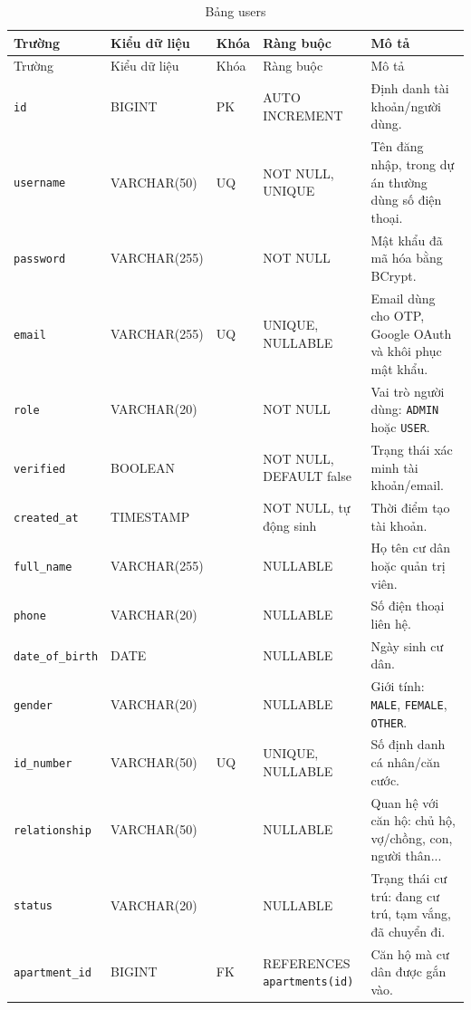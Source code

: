 ﻿\documentclass[12pt,a4paper]{report}
\begin{document}
\begingroup\scriptsize

\begin{longtable}{L{4.2cm} L{2.15cm} L{0.75cm} L{3.05cm} L{4.0cm}}
\caption{Bảng users}\label{tab:db-users}\\
\toprule
Trường & Kiểu dữ liệu & Khóa & Ràng buộc & Mô tả \\
\midrule
\endfirsthead
\toprule Trường & Kiểu dữ liệu & Khóa & Ràng buộc & Mô tả \\\midrule
\endhead
\texttt{id} & BIGINT & PK & AUTO INCREMENT & Định danh tài khoản/người dùng. \\
\texttt{username} & VARCHAR(50) & UQ & NOT NULL, UNIQUE & Tên đăng nhập, trong dự án thường dùng số điện thoại. \\
\texttt{password} & VARCHAR(255) & & NOT NULL & Mật khẩu đã mã hóa bằng BCrypt. \\
\texttt{email} & VARCHAR(255) & UQ & UNIQUE, NULLABLE & Email dùng cho OTP, Google OAuth và khôi phục mật khẩu. \\
\texttt{role} & VARCHAR(20) & & NOT NULL & Vai trò người dùng: \texttt{ADMIN} hoặc \texttt{USER}. \\
\texttt{verified} & BOOLEAN & & NOT NULL, DEFAULT false & Trạng thái xác minh tài khoản/email. \\
\texttt{created\_at} & TIMESTAMP & & NOT NULL, tự động sinh & Thời điểm tạo tài khoản. \\
\texttt{full\_name} & VARCHAR(255) & & NULLABLE & Họ tên cư dân hoặc quản trị viên. \\
\texttt{phone} & VARCHAR(20) & & NULLABLE & Số điện thoại liên hệ. \\
\texttt{date\_of\_birth} & DATE & & NULLABLE & Ngày sinh cư dân. \\
\texttt{gender} & VARCHAR(20) & & NULLABLE & Giới tính: \texttt{MALE}, \texttt{FEMALE}, \texttt{OTHER}. \\
\texttt{id\_number} & VARCHAR(50) & UQ & UNIQUE, NULLABLE & Số định danh cá nhân/căn cước. \\
\texttt{relationship} & VARCHAR(50) & & NULLABLE & Quan hệ với căn hộ: chủ hộ, vợ/chồng, con, người thân... \\
\texttt{status} & VARCHAR(20) & & NULLABLE & Trạng thái cư trú: đang cư trú, tạm vắng, đã chuyển đi. \\
\texttt{apartment\_id} & BIGINT & FK & REFERENCES \texttt{apartments(id)} & Căn hộ mà cư dân được gắn vào. \\
\bottomrule
\end{longtable}
\end{document}
